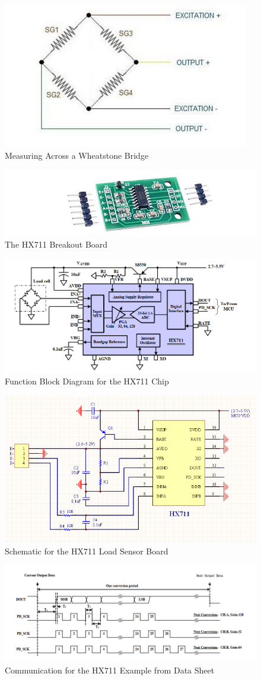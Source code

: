 \documentclass[11pt]{article}
\begin{document}
\begin{figure}[H]
	\centering
	\includegraphics[width = 0.3\linewidth]{bridgeConnefiguration}
	\caption{Measuring Across a Wheatstone Bridge}
	\label{fig:Bridge}
\end{figure}
\begin{figure}[H]
	\centering
	\includegraphics[width = 0.4\linewidth]{breakout}
	\caption{The HX711 Breakout Board}
	\label{fig:loadboard}
\end{figure}
\begin{figure}[H]
	\centering
	\includegraphics[width = 0.7\linewidth]{hx711applicationBlock}
	\caption{Function Block Diagram for the HX711 Chip}
	\label{fig:hx711blocks}
\end{figure}
\begin{figure}[H]
	\centering
	\includegraphics[width = 0.7\linewidth]{HX711}
	\caption{Schematic for the HX711 Load Sensor Board}
	\label{fig:HX711}
\end{figure}
\begin{figure}[H]
	\centering
	\includegraphics[width = 0.8\linewidth]{exampleDatashaeet}
	\caption{Communication for the HX711 Example from Data Sheet}
	\label{fig:hx711Communication}
\end{figure}
\end{document}

